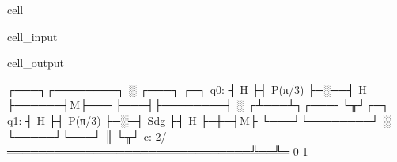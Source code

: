 \documentclass[letterpaper,10pt,english]{jupyterBook}
\begin{document}
\begin{sphinxuseclass}{cell}
\begin{sphinxVerbatimInput}
\begin{sphinxuseclass}{cell_input}
\end{sphinxuseclass}\end{sphinxVerbatimInput}
\begin{sphinxVerbatimOutput}

\begin{sphinxuseclass}{cell_output}
\begin{sphinxVerbatim}[commandchars=\\\{\}]
     ┌───┐┌────────┐ ░  ┌───┐      ┌─┐
q\PYGZus{}0: ┤ H ├┤ P(π/3) ├─░──┤ H ├──────┤M├───
     ├───┤├────────┤ ░ ┌┴───┴┐┌───┐└╥┘┌─┐
q\PYGZus{}1: ┤ H ├┤ P(π/3) ├─░─┤ Sdg ├┤ H ├─╫─┤M├
     └───┘└────────┘ ░ └─────┘└───┘ ║ └╥┘
c: 2/═══════════════════════════════╩══╩═
                                    0  1
\end{sphinxVerbatim}

\end{sphinxuseclass}\end{sphinxVerbatimOutput}

\end{sphinxuseclass}
\end{document}
